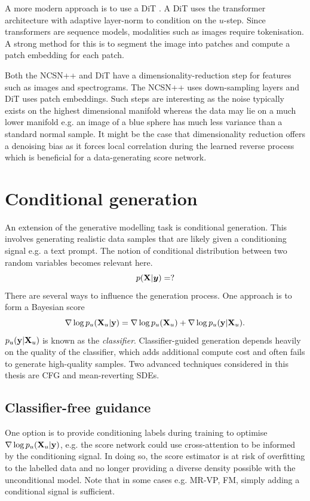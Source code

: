 A more modern approach is to use a \ac{DiT} \citep{peeblesScalableDiffusionModels2023}. A \ac{DiT} uses the transformer architecture with adaptive layer-norm to condition on the $u$-step. Since transformers are sequence models, modalities such as images require tokenisation. A strong method for this is to segment the image into patches and compute a patch embedding for each patch.

Both the NCSN++ and \ac{DiT} have a dimensionality-reduction step for features such as images and spectrograms. The NCSN++ uses down-sampling layers and \ac{DiT} uses patch embeddings. Such steps are interesting as the noise typically exists on the highest dimensional manifold whereas the data may lie on a much lower manifold e.g. an image of a blue sphere has much less variance than a standard normal sample. It might be the case that dimensionality reduction offers a denoising bias as it forces local correlation during the learned reverse process which is beneficial for a data-generating score network.

\section{Conditional generation}

An extension of the generative modelling task is conditional generation. This involves generating realistic data samples that are likely given a conditioning signal e.g. a text prompt. The notion of conditional distribution between two random variables becomes relevant here.
\[
p({\mathbf{X}}|{\bm{y}})=?
\]
There are several ways to influence the generation process. One approach is to form a Bayesian score
\[
\nabla\log p_u({\mathbf{X}}_u|{\mathbf{y}})=\nabla\log p_u({\mathbf{X}}_u) + \nabla\log p_u({\mathbf{y}}|{\mathbf{X}}_u).
\]
$p_u({\mathbf{y}}|{\mathbf{X}}_u)$ is known as the \textit{classifier}. Classifier-guided generation depends heavily on the quality of the classifier, which adds additional compute cost and often fails to generate high-quality samples. Two advanced techniques considered in this thesis are \ac{CFG} and mean-reverting \acp{SDE}.
\subsection{Classifier-free guidance}


One option is to provide conditioning labels during training to optimise $\nabla\log p_u({\mathbf{X}}_u|{\mathbf{y}})$, e.g. the score network could use cross-attention to be informed by the conditioning signal. In doing so, the score estimator is at risk of overfitting to the labelled data and no longer providing a diverse density possible with the unconditional model. Note that in some cases e.g. \ac{MR-VP}, \ac{FM}, simply adding a conditional signal is sufficient.

